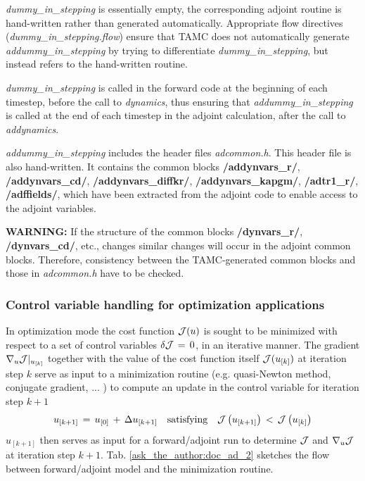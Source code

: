 \begin{itemize}
{\it dummy\_in\_stepping} is essentially empty,
the corresponding adjoint routine is hand-written rather
than generated automatically.
Appropriate flow directives ({\it dummy\_in\_stepping.flow})
ensure that TAMC does not automatically 
generate {\it addummy\_in\_stepping} by trying to differentiate
{\it dummy\_in\_stepping}, but instead refers to 
the hand-written routine.

{\it dummy\_in\_stepping} is called in the forward code
at the beginning of each
timestep, before the call to {\it dynamics}, thus ensuring
that {\it addummy\_in\_stepping} is called at the end of
each timestep in the adjoint calculation, after the call to
{\it addynamics}.

{\it addummy\_in\_stepping} includes the header files
{\it adcommon.h}.
This header file is also hand-written. It contains
the common blocks 
{\bf /addynvars\_r/}, {\bf /addynvars\_cd/},
{\bf /addynvars\_diffkr/}, {\bf /addynvars\_kapgm/},
{\bf /adtr1\_r/}, {\bf /adffields/},
which have been extracted from the adjoint code to enable
access to the adjoint variables.

{\bf WARNING:} If the structure of the common blocks
{\bf /dynvars\_r/}, {\bf /dynvars\_cd/}, etc., changes
similar changes will occur in the adjoint common blocks.
Therefore, consistency between the TAMC-generated common blocks
and those in {\it adcommon.h} have to be checked.
%
\end{itemize}


\subsubsection{Control variable handling for 
optimization applications}

In optimization mode the cost function $ {\cal J}(u) $ is sought
to be minimized with respect to a set of control variables
$ \delta {\cal J} \, = \, 0 $, in an iterative manner.
The gradient $ \nabla _{u}{\cal J} |_{u_{[k]}} $ together
with the value of the cost function itself $ {\cal J}(u_{[k]}) $ 
at iteration step $ k $ serve
as input to a minimization routine (e.g. quasi-Newton method,
conjugate gradient, ... \cite{gil-lem:89}) 
to compute an update in the
control variable for iteration step $k+1$
\[
u_{[k+1]} \, = \,  u_{[0]} \, + \, \Delta u_{[k+1]}
\quad \mbox{satisfying} \quad
 {\cal J} \left( u_{[k+1]} \right) \, < \, {\cal J} \left( u_{[k]} \right)
\]
$ u_{[k+1]} $ then serves as input for a forward/adjoint run
to determine $ {\cal J} $ and $ \nabla _{u}{\cal J} $ at iteration step
$ k+1 $.
Tab. \ref{ask_the_author:doc_ad_2} sketches the flow between forward/adjoint model
and the minimization routine.

